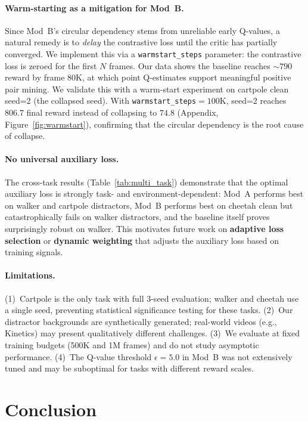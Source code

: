 \documentclass{article}
\begin{document}
\paragraph{Warm-starting as a mitigation for Mod~B.}
Since Mod~B's circular dependency stems from unreliable early Q-values, a natural remedy is to \emph{delay} the contrastive loss until the critic has partially converged.
We implement this via a \texttt{warmstart\_steps} parameter: the contrastive loss is zeroed for the first $N$ frames.
Our data shows the baseline reaches ${\sim}790$ reward by frame 80K, at which point Q-estimates support meaningful positive pair mining.
We validate this with a warm-start experiment on cartpole clean seed=2 (the collapsed seed).
With \texttt{warmstart\_steps}$=100$K, seed=2 reaches $806.7$ final reward instead of collapsing to $74.8$ (Appendix, Figure~\ref{fig:warmstart}), confirming that the circular dependency is the root cause of collapse.

\paragraph{No universal auxiliary loss.}
The cross-task results (Table~\ref{tab:multi_task}) demonstrate that the optimal auxiliary loss is strongly task- and environment-dependent: Mod~A performs best on walker and cartpole distractors, Mod~B performs best on cheetah clean but catastrophically fails on walker distractors, and the baseline itself proves surprisingly robust on walker.
This motivates future work on \textbf{adaptive loss selection} or \textbf{dynamic weighting} that adjusts the auxiliary loss based on training signals.

\paragraph{Limitations.}
(1)~Cartpole is the only task with full 3-seed evaluation; walker and cheetah use a single seed, preventing statistical significance testing for these tasks.
(2)~Our distractor backgrounds are synthetically generated; real-world videos (e.g., Kinetics) may present qualitatively different challenges.
(3)~We evaluate at fixed training budgets (500K and 1M frames) and do not study asymptotic performance.
(4)~The Q-value threshold $\epsilon=5.0$ in Mod~B was not extensively tuned and may be suboptimal for tasks with different reward scales.

\section{Conclusion}
\label{sec:conclusion}
\end{document}
